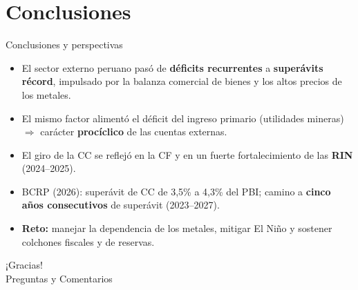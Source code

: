 \documentclass[10pt,aspectratio=169]{beamer}
\begin{document}
\section{Conclusiones}
\begin{frame}{Conclusiones y perspectivas}
  \begin{itemize}
    \item El sector externo peruano pasó de \textbf{déficits recurrentes} a \textbf{superávits récord}, impulsado por la balanza comercial de bienes y los altos precios de los metales.
    \item El mismo factor alimentó el déficit del ingreso primario (utilidades mineras) $\Rightarrow$ carácter \textbf{procíclico} de las cuentas externas.
    \item El giro de la CC se reflejó en la CF y en un fuerte fortalecimiento de las \textbf{RIN} (2024--2025).
    \item BCRP (2026): superávit de CC de 3{,}5\% a 4{,}3\% del PBI; camino a \textbf{cinco años consecutivos} de superávit (2023--2027).
    \item \textbf{Reto:} manejar la dependencia de los metales, mitigar El Niño y sostener colchones fiscales y de reservas.
  \end{itemize}
\end{frame}

{
\begin{frame}[plain]
  \centering
  \vspace{2.2cm}
  {\color{white}\Huge ¡Gracias!}\\[0.8em]
  {\color{white!85}\Large Preguntas y Comentarios}
\end{frame}
}
\end{document}
